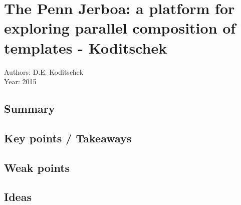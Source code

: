 \section{The Penn Jerboa: a platform for exploring parallel composition of templates - Koditschek}
Authors: D.E. Koditschek\\
Year: 2015
\subsection*{Summary}
\subsection*{Key points / Takeaways}
\subsection*{Weak points}
\subsection*{Ideas}
